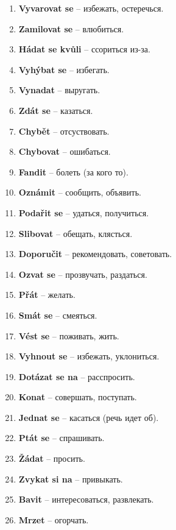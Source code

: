 \documentclass[12pt]{book}
\begin{document}
\begin{enumerate}
    \item \textbf{Vyvarovat se} -- \textrussian{избежать, остеречься}.
    \item \textbf{Zamilovat se} -- \textrussian{влюбиться}.
    \item \textbf{Hádat se kvůli} -- \textrussian{ссориться из-за}.
    \item \textbf{Vyhýbat se} -- \textrussian{избегать}.
    \item \textbf{Vynadat} -- \textrussian{выругать}.
    \item \textbf{Zdát se} -- \textrussian{казаться}.
    \item \textbf{Chybět} -- \textrussian{отсуствовать}.
    \item \textbf{Chybovat} -- \textrussian{ошибаться}.
    \item \textbf{Fandit} -- \textrussian{болеть (за кого то)}.
    \item \textbf{Oznámit} -- \textrussian{сообщить, объявить}.
    \item \textbf{Podařit se} -- \textrussian{удаться, получиться}.
    \item \textbf{Slibovat} -- \textrussian{обещать, клясться}.
    \item \textbf{Doporučit} -- \textrussian{рекомендовать, советовать}.
    \item \textbf{Ozvat se} -- \textrussian{прозвучать, раздаться}.
    \item \textbf{Přát} -- \textrussian{желать}.
    \item \textbf{Smát se} -- \textrussian{смеяться}.
    \item \textbf{Vést se} -- \textrussian{поживать, жить}.
    \item \textbf{Vyhnout se} -- \textrussian{избежать, уклониться}.
    \item \textbf{Dotázat se na} -- \textrussian{расспросить}.
    \item \textbf{Konat} -- \textrussian{совершать, поступать}.
    \item \textbf{Jednat se} -- \textrussian{касаться (речь идет об)}.
    \item \textbf{Ptát se} -- \textrussian{спрашивать}.
    \item \textbf{Žádat} -- \textrussian{просить}.
    \item \textbf{Zvykat si na} -- \textrussian{привыкать}.
    \item \textbf{Bavit} -- \textrussian{интересоваться, развлекать}.
    \item \textbf{Mrzet} -- \textrussian{огорчать}.

\end{enumerate}
\end{document}
